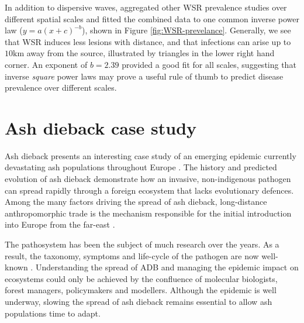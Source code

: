 In addition to dispersive waves, \cite{severns2019consequences} aggregated other WSR prevalence studies over different spatial 
scales and fitted the combined data to one common inverse power law ($y=a(x+c)^{-b}$), shown in Figure \ref{fig:WSR-prevelance}.
Generally, we see that WSR induces less lesions with distance, and that infections can arise up to $10\mathrm{km}$ away from the source,
illustrated by triangles in the lower right hand corner.
An exponent of $b=2.39$ provided a good fit for all scales, suggesting that inverse \textit{square} power laws may 
prove a useful rule of thumb to predict disease prevalence over different scales.


\section{Ash dieback case study}


\label{ch2:ash-dieback}
Ash dieback presents an interesting case study of an emerging epidemic currently devastating ash
populations throughout Europe \cite{enderle2019overview}. The history and predicted evolution of ash dieback
demonstrate how an invasive, non-indigenous pathogen can spread rapidly through a foreign ecosystem that 
lacks evolutionary defences. Among the many factors driving the spread of ash dieback, long-distance 
anthropomorphic trade is the mechanism responsible for the initial introduction into Europe from the
far-east \cite{zhao2013hymenoscyphus, queloz2011cryptic}.

The pathosystem has been the subject of much research over the years. As a result, the taxonomy, 
symptoms and life-cycle of the pathogen are  now well-known \cite{https://doi.org/10.1111/mpp.12073}. 
Understanding the spread of ADB and managing the epidemic impact on ecosystems could only be achieved
by the confluence of molecular biologists, forest managers, policymakers and modellers. Although the epidemic
is well underway, slowing the spread of ash dieback remains essential to allow ash populations time to adapt.

